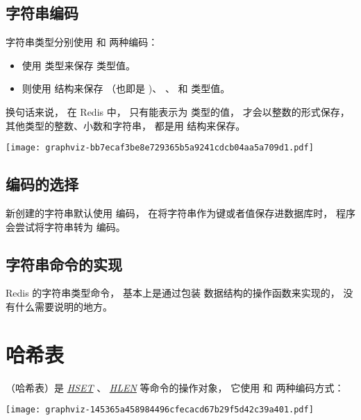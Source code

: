 \documentclass[a4paper,11pt,english]{sphinxmanual}
\begin{document}
\subsection{字符串编码}
\label{datatype/string:id2}
字符串类型分别使用  和  两种编码：
\begin{itemize}
\item {} 
 使用  类型来保存  类型值。

\item {} 
 则使用  结构来保存  （也即是  )、  、  和  类型值。

\end{itemize}

换句话来说，
在 Redis 中，
只有能表示为  类型的值，
才会以整数的形式保存，
其他类型的整数、小数和字符串，
都是用  结构来保存。

\texttt{[image: graphviz-bb7ecaf3be8e729365b5a9241cdcb04aa5a709d1.pdf]}


\subsection{编码的选择}
\label{datatype/string:id3}
新创建的字符串默认使用  编码，
在将字符串作为键或者值保存进数据库时，
程序会尝试将字符串转为  编码。


\subsection{字符串命令的实现}
\label{datatype/string:id4}
Redis 的字符串类型命令，
基本上是通过包装  数据结构的操作函数来实现的，
没有什么需要说明的地方。


\section{哈希表}
\label{datatype/hash:hash-chapter}\label{datatype/hash::doc}\label{datatype/hash:id1}
 （哈希表）是 \href{http://redis.readthedocs.org/en/latest/hash/hset.html\#hset}{\emph{HSET}} 、 \href{http://redis.readthedocs.org/en/latest/hash/hlen.html\#hlen}{\emph{HLEN}} 等命令的操作对象，
它使用  和  两种编码方式：

\texttt{[image: graphviz-145365a458984496cfecacd67b29f5d42c39a401.pdf]}
\end{document}
